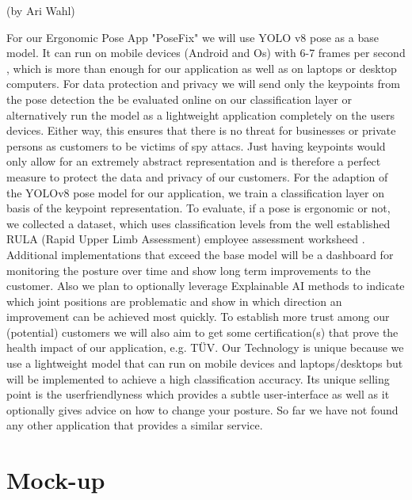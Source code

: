 (by Ari Wahl)

\p
For our Ergonomic Pose App "PoseFix" we will use YOLO v8 pose as a base model. 
It can run on mobile devices (Android and Os) with 6-7 frames per second \cite{ultralytics2022}, 
which is more than enough for our application as well as on laptops or desktop computers. For data protection and privacy we will send only the keypoints from the pose detection 
the be evaluated online on our classification layer or alternatively run the model as a lightweight application completely on the users devices. 
Either way, this ensures that there is no threat for businesses or private persons as customers to be victims of spy attacs. Just having keypoints 
would only allow for an extremely abstract representation and is therefore a perfect measure to protect the data and privacy of our customers. 
For the adaption of the YOLOv8 pose model for our application, we train a classification layer on basis of the keypoint representation. 
To evaluate, if a pose is ergonomic or not, we collected a dataset, which uses classification levels from the well established RULA (Rapid Upper Limb Assessment) employee assessment 
worksheed \cite{Holzgreve_2022}. 
Additional implementations that exceed the base model will be a dashboard for monitoring the posture over time and show long term improvements 
to the customer. Also we plan to optionally leverage Explainable AI methods to indicate which joint positions are problematic and show
 in which direction an improvement can be achieved most quickly. To establish more trust among our (potential) customers 
 we will also aim to get some certification(s) that prove the health impact of our application, e.g. TÜV. 
Our Technology is unique because we use a lightweight model that can run on mobile devices and laptops/desktops but will be implemented to achieve a high classification accuracy.
Its unique selling point is the userfriendlyness which provides a subtle user-interface as well as it optionally gives advice on how to change your posture.
So far we have not found any other application that provides a similar service.

\section{Mock-up}

